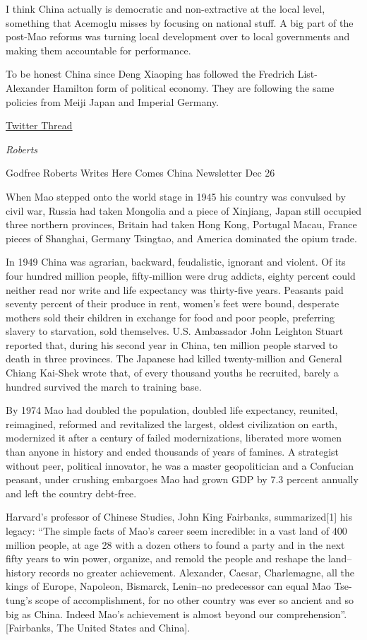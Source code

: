 \documentclass[
]{book}
\begin{document}
I think China actually is democratic and non-extractive at the local level, something that Acemoglu misses by focusing on national stuff. A big part of the post-Mao reforms was turning local development over to local governments and making them accountable for performance.

To be honest China since Deng Xiaoping has followed the Fredrich List- Alexander Hamilton form of political economy. They are following the same policies from Meiji Japan and Imperial Germany.

\href{https://twitter.com/RichardHanania/status/1403124768560205825}{Twitter Thread}

\emph{Roberts}

Godfree Roberts
Writes Here Comes China Newsletter
Dec 26

When Mao stepped onto the world stage in 1945 his country was convulsed by civil war, Russia had taken Mongolia and a piece of Xinjiang, Japan still occupied three northern provinces, Britain had taken Hong Kong, Portugal Macau, France pieces of Shanghai, Germany Tsingtao, and America dominated the opium trade.

In 1949 China was agrarian, backward, feudalistic, ignorant and violent. Of its four hundred million people, fifty-million were drug addicts, eighty percent could neither read nor write and life expectancy was thirty-five years. Peasants paid seventy percent of their produce in rent, women's feet were bound, desperate mothers sold their children in exchange for food and poor people, preferring slavery to starvation, sold themselves. U.S. Ambassador John Leighton Stuart reported that, during his second year in China, ten million people starved to death in three provinces. The Japanese had killed twenty-million and General Chiang Kai-Shek wrote that, of every thousand youths he recruited, barely a hundred survived the march to training base.

By 1974 Mao had doubled the population, doubled life expectancy, reunited, reimagined, reformed and revitalized the largest, oldest civilization on earth, modernized it after a century of failed modernizations, liberated more women than anyone in history and ended thousands of years of famines. A strategist without peer, political innovator, he was a master geopolitician and a Confucian peasant, under crushing embargoes Mao had grown GDP by 7.3 percent annually and left the country debt-free.

Harvard's professor of Chinese Studies, John King Fairbanks, summarized{[}1{]} his legacy: ``The simple facts of Mao's career seem incredible: in a vast land of 400 million people, at age 28 with a dozen others to found a party and in the next fifty years to win power, organize, and remold the people and reshape the land--history records no greater achievement. Alexander, Caesar, Charlemagne, all the kings of Europe, Napoleon, Bismarck, Lenin--no predecessor can equal Mao Tse-tung's scope of accomplishment, for no other country was ever so ancient and so big as China. Indeed Mao's achievement is almost beyond our comprehension''. {[}Fairbanks, The United States and China{]}.
\end{document}
